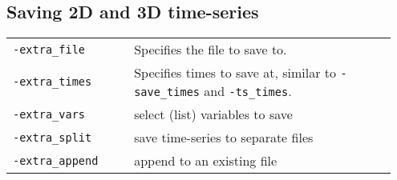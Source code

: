 \documentclass[landscape]{article}
\begin{document}
\begin{textblock}{15}
\section{Saving 2D and 3D time-series}
\label{sec:extras}
\begin{tabular}{@{}p{0.3\linewidth}p{0.65\linewidth}@{}}
\texttt{-extra_file} & Specifies the file to save to.\\
\texttt{-extra_times} & Specifies times to save at, similar to
\texttt{-save_times} and \mbox{\texttt{-ts_times}}. \\
\texttt{-extra_vars} & select (list) variables to save\\
\texttt{-extra_split} & save time-series to separate files\\
\texttt{-extra_append} & append to an existing file\\
\end{tabular}

\end{textblock}
\end{document}
